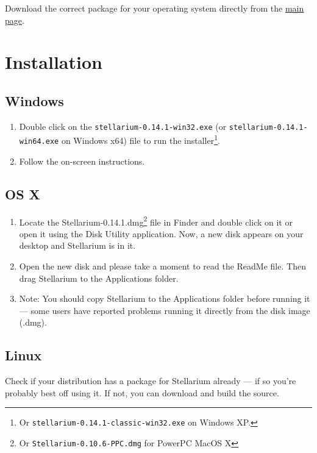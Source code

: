 Download the correct package for your operating system directly from the
\href{http://stellarium.org}{main page}.

\section{Installation}

\subsection{Windows}

\begin{enumerate}
\item
  Double click on the \texttt{stellarium-0.14.1-win32.exe} (or
  \texttt{stellarium-0.14.1-win64.exe} on Windows x64) file to run the
  installer\footnote{Or \texttt{stellarium-0.14.1-classic-win32.exe} on
    Windows XP.}.
\item
  Follow the on-screen instructions.
\end{enumerate}

\subsection{OS X}

\begin{enumerate}
\item
  Locate the Stellarium-0.14.1.dmg\footnote{Or
    \texttt{Stellarium-0.10.6-PPC.dmg} for PowerPC MacOS X} file in
  Finder and double click on it or open it using the Disk Utility
  application. Now, a new disk appears on your desktop and Stellarium is
  in it.
\item
  Open the new disk and please take a moment to read the ReadMe file.
  Then drag Stellarium to the Applications folder.
\item
  Note: You should copy Stellarium to the Applications folder before
  running it --- some users have reported problems running it directly
  from the disk image (.dmg).
\end{enumerate}

\subsection{Linux}

Check if your distribution has a package for Stellarium already --- if
so you're probably best off using it. If not, you can download and build
the source.

